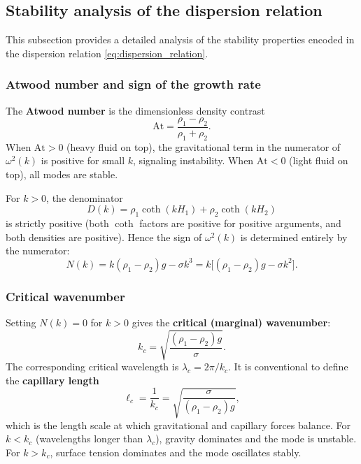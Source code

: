 \documentclass[11pt,a4paper]{article}
\begin{document}
\subsection{Stability analysis of the dispersion relation}

This subsection provides a detailed analysis of the stability properties encoded in the dispersion relation \eqref{eq:dispersion_relation}.

\subsubsection{Atwood number and sign of the growth rate}

The \textbf{Atwood number} is the dimensionless density contrast
\begin{equation}
    \mathrm{At} = \frac{\rho_1-\rho_2}{\rho_1+\rho_2}.
    \label{eq:atwood_number}
\end{equation}
When $\mathrm{At}>0$ (heavy fluid on top), the gravitational term in the numerator of $\omega^2(k)$ is positive for small $k$, signaling instability.  When $\mathrm{At}<0$ (light fluid on top), all modes are stable.

For $k>0$, the denominator
\begin{equation}
    D(k)=\rho_1\coth(kH_1)+\rho_2\coth(kH_2)
    \label{eq:denominator_D}
\end{equation}
is strictly positive (both $\coth$ factors are positive for positive arguments, and both densities are positive).  Hence the sign of $\omega^2(k)$ is determined entirely by the numerator:
\begin{equation}
    N(k) = k(\rho_1-\rho_2)g - \sigma k^3 = k\bigl[(\rho_1-\rho_2)g - \sigma k^2\bigr].
    \label{eq:numerator_N}
\end{equation}

\subsubsection{Critical wavenumber}

Setting $N(k)=0$ for $k>0$ gives the \textbf{critical (marginal) wavenumber}:
\begin{equation}
    k_c = \sqrt{\frac{(\rho_1-\rho_2)g}{\sigma}}.
    \label{eq:critical_wavenumber_analysis}
\end{equation}
The corresponding critical wavelength is $\lambda_c = 2\pi/k_c$.  It is conventional to define the \textbf{capillary length}
\begin{equation}
    \ell_c = \frac{1}{k_c} = \sqrt{\frac{\sigma}{(\rho_1-\rho_2)g}},
    \label{eq:capillary_length}
\end{equation}
which is the length scale at which gravitational and capillary forces balance.  For $k<k_c$ (wavelengths longer than $\lambda_c$), gravity dominates and the mode is unstable.  For $k>k_c$, surface tension dominates and the mode oscillates stably.
\end{document}

